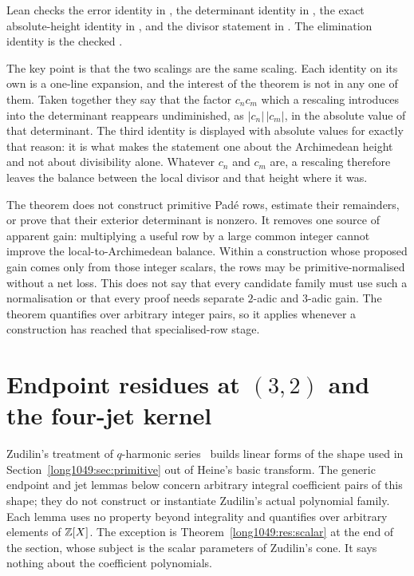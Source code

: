 \documentclass[11pt]{article}
\begin{document}
\noindent Lean checks the error identity in
, the determinant identity in
, the exact absolute-height identity in
, and the divisor statement in
.  The elimination identity is the checked
.

The key point is that the two scalings are the same scaling.  Each identity on
its own is a one-line expansion, and the interest of the theorem is not in any
one of them.  Taken together they say that the factor \(c_nc_m\) which a
rescaling introduces into the determinant reappears undiminished, as
\(|c_n|\,|c_m|\), in the absolute value of that determinant.  The third
identity is displayed with absolute values for exactly that reason: it is what
makes the statement one about the Archimedean height and not about divisibility
alone.  Whatever \(c_n\) and \(c_m\) are, a rescaling therefore leaves the
balance between the local divisor and that height where it was.

The theorem does not construct primitive Pad\'e rows, estimate their
remainders, or prove that their exterior determinant is nonzero.  It removes
one source of apparent gain: multiplying a useful row by a large common
integer cannot improve the local-to-Archimedean balance.  Within a construction
whose proposed gain comes only from those integer scalars, the rows may be
primitive-normalised without a net loss.  This does not say that every
candidate family must use such a normalisation or that every proof needs
separate \(2\)-adic and \(3\)-adic gain.  The theorem quantifies over arbitrary
integer pairs, so it applies whenever a construction has reached that
specialised-row stage.

\section{Endpoint residues at $(3,2)$ and the four-jet
kernel}\label{long1049:sec:endpoints}

Zudilin's treatment of \(q\)-harmonic series~\cite{zudilin2004} builds linear
forms of the shape used in Section~\ref{long1049:sec:primitive} out of Heine's basic
transform.  The generic endpoint and jet lemmas below concern arbitrary
integral coefficient pairs of this shape; they do not construct or instantiate
Zudilin's actual polynomial family.  Each lemma uses no property beyond
integrality and quantifies over arbitrary elements of \(\mathbb{Z}[X]\).  The exception is
Theorem~\ref{long1049:res:scalar} at the end of the section, whose subject is the scalar
parameters of Zudilin's cone.  It says nothing about the coefficient
polynomials.
\end{document}
